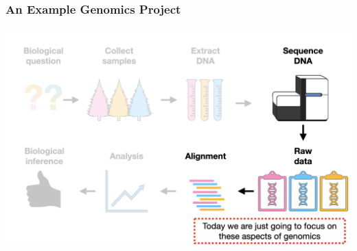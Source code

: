 \documentclass{beamer}
\begin{document}
\begin{frame}
	\frametitle{An Example Genomics Project}
	\centering	\includegraphics[keepaspectratio, width  =\textwidth]{img/bio_project_masked}
\end{frame}
\end{document}
